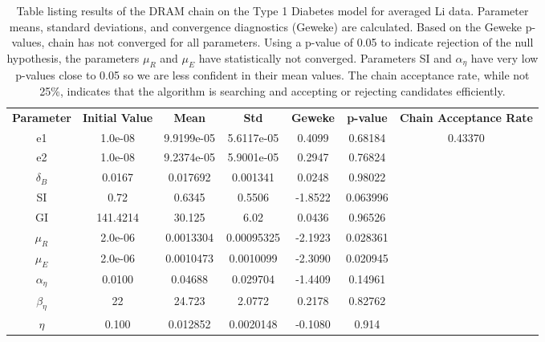 \begin{table}[H]
\centering
        \begin{tabular}{c c |c c | c c||c}
            \hline
            \textbf{Parameter} & \textbf{Initial Value} & \textbf{Mean} &  \textbf{Std} & \textbf{Geweke} & \textbf{ p-value} &\textbf{Chain Acceptance Rate}\\ 
            \cline{1-7}
            e1 & 1.0e-08 & 9.9199e-05 & 5.6117e-05 & 0.4099 &  0.68184 & \multirow{10}{*}{0.43370} \\
            e2 & 1.0e-08 & 9.2374e-05 & 5.9001e-05 & 0.2947 & 0.76824\\
            $\delta_B$ & 0.0167 & 0.017692 &  0.001341 & 0.0248 & 0.98022\\
            SI & 0.72 & 0.6345 & 0.5506  & -1.8522 & 0.063996\\
            GI & 141.4214 & 30.125 & 6.02 & 0.0436 & 0.96526\\
            $\mu_R$ & 2.0e-06 & 0.0013304 & 0.00095325 & -2.1923 & 0.028361\\
            $\mu_E$ & 2.0e-06 & 0.0010473 &  0.0010099 & -2.3090 & 0.020945\\
            $\alpha_{\eta}$ & 0.0100 & 0.04688 &  0.029704 & -1.4409 & 0.14961\\
            $\beta_{\eta}$ & 22 &  24.723 & 2.0772 & 0.2178 & 0.82762\\
            $\eta$ & 0.100 & 0.012852 &  0.0020148 & -0.1080 & 0.914
             \\\hline
                          \hline
        \end{tabular}
    \caption{Table listing results of the DRAM chain on the Type 1 Diabetes model for averaged Li data. Parameter means, standard deviations, and convergence diagnostics (Geweke) are calculated. Based on the Geweke p-values, chain has not converged for all parameters. Using a p-value of 0.05 to indicate rejection of the null hypothesis, the parameters $\mu_R$ and $\mu_E$ have statistically not converged. Parameters SI and $\alpha_\eta$ have very low p-values close to 0.05 so we are less confident in their mean values. The chain acceptance rate, while not 25\%, indicates that the algorithm is searching and accepting or rejecting candidates efficiently.}
    \label{tab:5mcmc} 
\end{table}
